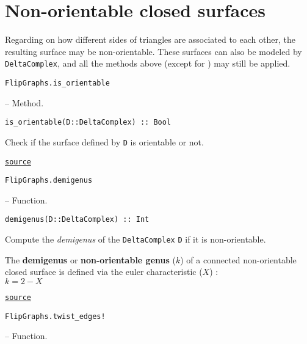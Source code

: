 \section{Non-orientable closed surfaces}



\label{10870430378047419872}{}


Regarding on how different sides of triangles are associated to each other, the resulting surface may be non-orientable. These surfaces can also be modeled by \texttt{DeltaComplex}, and all the methods above (except for ) may still be applied.


\hypertarget{15427213162715270496}{\texttt{FlipGraphs.is\_orientable}}  -- {Method.}

\begin{adjustwidth}{2em}{0pt}


\begin{verbatim}
is_orientable(D::DeltaComplex) :: Bool
\end{verbatim}

Check if the surface defined by \texttt{D} is orientable or not.



\href{https://github.com/schto223/FlipGraphs.jl/blob/e35d43698a06b86273148826b79d585ba04fcd26/src/deltaComplex.jl#L995-L999}{\texttt{source}}


\end{adjustwidth}
\hypertarget{9818394393198899675}{\texttt{FlipGraphs.demigenus}}  -- {Function.}

\begin{adjustwidth}{2em}{0pt}


\begin{verbatim}
demigenus(D::DeltaComplex) :: Int
\end{verbatim}

Compute the \emph{demigenus} of the \texttt{DeltaComplex} \texttt{D} if it is non-orientable.

The \textbf{demigenus} or \textbf{non-orientable genus} (\(k\)) of a connected non-orientable closed surface is defined via the euler characteristic (\(X\)) :\\
\(k = 2 - X\)



\href{https://github.com/schto223/FlipGraphs.jl/blob/e35d43698a06b86273148826b79d585ba04fcd26/src/deltaComplex.jl#L392-L399}{\texttt{source}}


\end{adjustwidth}
\hypertarget{17066969119815195638}{\texttt{FlipGraphs.twist\_edges!}}  -- {Function.}

